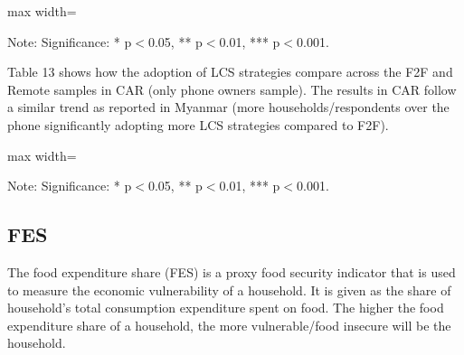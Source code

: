 \documentclass[11pt,harvard]{article}
\begin{document}
\begin{table}[htbp]
	\centering
	\begin{adjustbox}{max width=\textwidth}
		\begin{threeparttable}
			\caption{Ecaudor: Each Coping Strategy Used}
			\scriptsize
			 
			\label{tab:LCS_Ind_Modality_Ecuador}
			\begin{tablenotes}
				\item Note: Significance: * p$<$0.05, ** p$<$0.01, *** p$<$0.001. 
			\end{tablenotes}
		\end{threeparttable}
	\end{adjustbox}
	
	
Table 13 shows how the adoption of LCS strategies compare across the F2F and Remote samples in CAR (only phone owners sample). The results in CAR follow a similar trend as reported in Myanmar (more households/respondents over the phone significantly adopting more LCS strategies compared to F2F). 

\end{table}
\begin{table}[htbp]
	\centering
	\begin{adjustbox}{max width=\textwidth}
		\begin{threeparttable}
			\caption{CAR: Each Coping Strategy Used}
			\scriptsize
			 
			\label{tab:LCS_Ind_Modality_CAR}
			\begin{tablenotes}
				\item Note: Significance: * p$<$0.05, ** p$<$0.01, *** p$<$0.001. 
			\end{tablenotes}
		\end{threeparttable}
	\end{adjustbox}
\end{table}

\pagebreak

\subsection{FES}

The food expenditure share (FES) is a proxy food security indicator that is used to measure the economic vulnerability of a household. It is given as the share of household's total consumption expenditure spent on food. The higher the food expenditure share of a household, the more vulnerable/food insecure will be the household.
\end{document}
